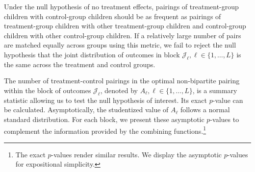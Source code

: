 Under the null hypothesis of no treatment effects, pairings of treatment-group children with control-group children should be as frequent as pairings of treatment-group children with other treatment-group children and control-group children with other control-group children. If a relatively large number of pairs are matched equally across groups using this metric, we fail to reject the null hypothesis that the joint distribution of outcomes in block $\mathcal{J}_{\ell}, \ell \in \{1,\dots ,L\}$ is the same across the treatment and control groups.

The number of treatment-control pairings in the optimal non-bipartite pairing within the block of outcomes $\mathcal{J}_\ell$, denoted by $A_{\ell}, \ell \in \{1,\dots ,L\}$, is a summary statistic allowing us to test the null hypothesis of interest. Its exact $p$-value can be calculated. Asymptotically, the studentized value of $A_\ell$ follows a normal standard distribution. For each block, we present these asymptotic $p$-values to complement the information provided by the combining functions.\footnote{The exact $p$-values render similar results. We display the asymptotic $p$-values for expositional simplicity.}
